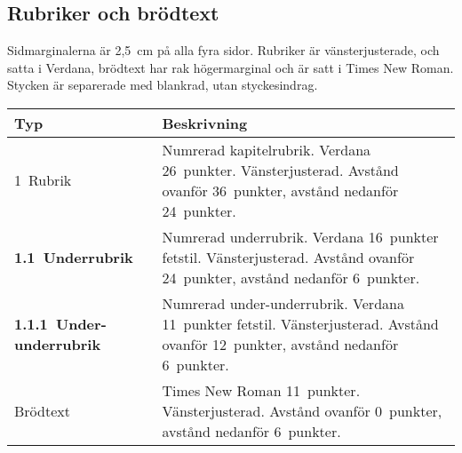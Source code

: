 

\subsection{Rubriker och brödtext}

Sidmarginalerna är 2,5~cm på alla fyra sidor. Rubriker är vänsterjusterade, och
satta i Verdana, brödtext har rak högermarginal och är satt i Times New Roman.
Stycken är separerade med blankrad, utan styckesindrag.

\medskip

\begin{tabular}{p{} p{}}
  \toprule
  {\sffamily\textbf{Typ}} &
  {\sffamily\textbf{Beskrivning}} \\
  \midrule
  {\sffamily\Large{}1~Rubrik} &
  Numrerad kapitelrubrik. Verdana 26~punkter. Vänsterjusterad.
  Avstånd ovanför 36~punkter, avstånd nedanför 24~punkter.
  \\
  \midrule
  {\sffamily\bfseries\large{}1.1~Underrubrik} &
  Numrerad underrubrik. Verdana 16~punkter fetstil. Vänsterjusterad.
  Avstånd ovanför 24~punkter, avstånd nedanför 6~punkter.
  \\
  \midrule
  {\sffamily\bfseries\normalsize{}1.1.1~Under-underrubrik} &
  Numrerad under-underrubrik. Verdana 11~punkter fetstil. Vänsterjusterad.
  Avstånd ovanför 12~punkter, avstånd nedanför 6~punkter.
  \\
  \midrule
  Brödtext &
  Times New Roman 11~punkter. Vänsterjusterad.
  Avstånd ovanför 0~punkter, avstånd nedanför 6~punkter.
  \\
  \bottomrule
\end{tabular}

